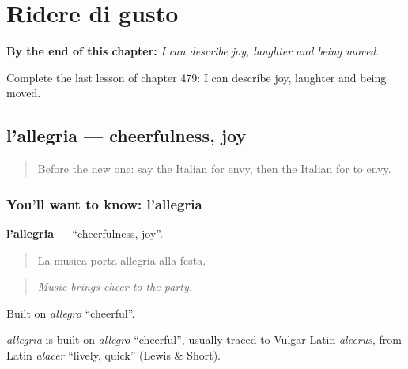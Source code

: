 
\chapter{Ridere di gusto}
\label{ch:it-ridere-di-gusto}

\begin{chapteropening}
\textbf{By the end of this chapter:} \emph{I can describe joy, laughter and being moved.}

Complete the last lesson of chapter 479: I can describe joy, laughter and being moved.
\end{chapteropening}

\section[l'allegria]{l'allegria — cheerfulness, joy}

\label{lesson:IT-C479-allegria}



\begin{quote}
Before the new one: say the Italian for envy, then the Italian for to envy.
\end{quote}

\subsection*{You'll want to know: l'allegria}
\textbf{l'allegria} — \textquotedblleft{}cheerfulness, joy\textquotedblright{}.

\begin{quote}
La musica porta allegria alla festa.
\end{quote}

\begin{quote}
\emph{Music brings cheer to the party.}
\end{quote}

Built on \emph{allegro} \textquotedblleft{}cheerful\textquotedblright{}.

\begin{cousinweb}
\emph{allegria} is built on \emph{allegro} \textquotedblleft{}cheerful\textquotedblright{}, usually traced to Vulgar Latin \emph{alecrus}, from Latin \emph{alacer} \textquotedblleft{}lively, quick\textquotedblright{} (Lewis \& Short).
\end{cousinweb}

